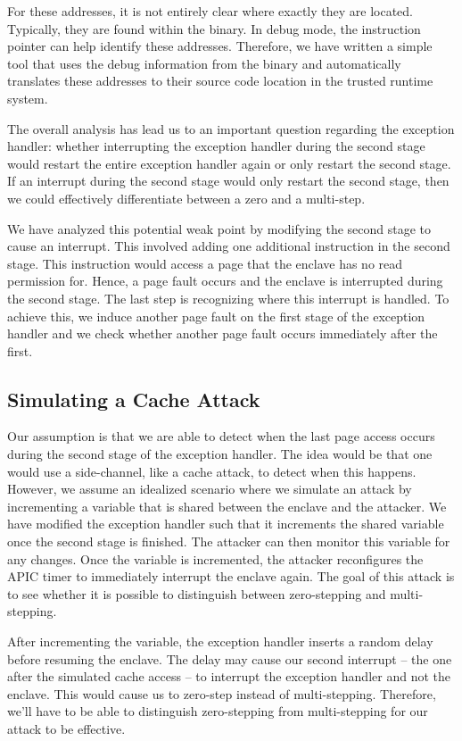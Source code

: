 \documentclass{llncs}
\begin{document}
For these addresses, it is not entirely clear where exactly they are located. Typically, they are found within the binary. In debug mode, the instruction pointer can help identify these addresses.
Therefore, we have written a simple tool that uses the debug information from the binary and
automatically translates these addresses to their source code location in the trusted runtime system.

The overall analysis has lead us to an important question regarding the exception handler:
whether interrupting the exception handler during the second stage would
restart the entire exception handler again or only restart the second stage.
If an interrupt during the second stage would only restart the second stage,
then we could effectively differentiate between a zero and a multi-step.

We have analyzed this potential weak point by modifying the second stage to cause an interrupt.
This involved adding one additional instruction in the second stage.
This instruction would access a page that the enclave has no read permission for.
Hence, a page fault occurs and the enclave is interrupted during the second stage.
The last step is recognizing where this interrupt is handled.
To achieve this, we induce another page fault on the first stage of the exception handler
and we check whether another page fault occurs immediately after the first.

\subsection{Simulating a Cache Attack}

Our assumption is that we are able to detect when the last page access occurs
during the second stage of the exception handler.
The idea would be that one would use a side-channel, like a cache attack, to detect when this happens.
However, we assume an idealized scenario where we simulate an attack by
incrementing a variable that is shared between the enclave and the attacker.
We have modified the exception handler such that it increments the shared
variable once the second stage is finished.
The attacker can then monitor this variable for any changes.
Once the variable is incremented, the attacker reconfigures the APIC timer to immediately interrupt the enclave again.
The goal of this attack is to see whether it is possible to distinguish between
zero-stepping and multi-stepping.

After incrementing the variable, the exception handler inserts a random delay
before resuming the enclave.
The delay may cause our second interrupt -- the one after the simulated cache
access -- to interrupt the exception handler and not the enclave.
This would cause us to zero-step instead of multi-stepping.
Therefore, we'll have to be able to distinguish zero-stepping from
multi-stepping for our attack to be effective.
\end{document}
